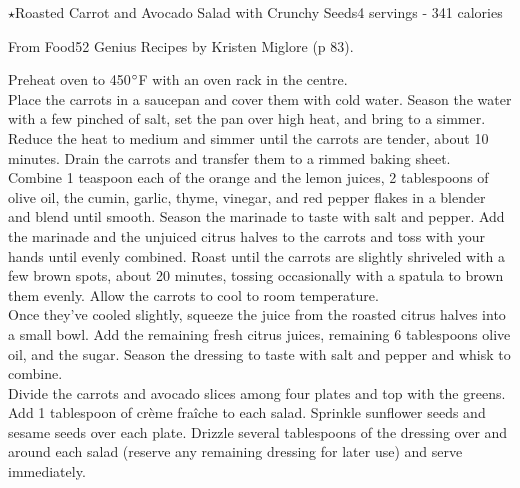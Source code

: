 \begin{recipe}{$\star$Roasted Carrot and Avocado Salad with Crunchy Seeds}{4 servings - 341 calories}{}

\freeform From {\normalfont Food52 Genius Recipes} by Kristen Miglore (p 83).


Preheat oven to 450$\degree$F with an oven rack in the centre.\\

Place the carrots in a saucepan and cover them with cold water. Season the water with a few pinched of salt, set the pan over high heat, and bring to a simmer. Reduce the heat to medium and simmer until the carrots are tender, about 10 minutes. Drain the carrots and transfer them to a rimmed baking sheet.\\

Combine 1 teaspoon each of the orange and the lemon juices, 2 tablespoons of olive oil, the cumin, garlic, thyme, vinegar, and red pepper flakes in a blender and blend until smooth. Season the marinade to taste with salt and pepper. Add the marinade and the unjuiced citrus halves to the carrots and toss with your hands until evenly combined. Roast until the carrots are slightly shriveled with a few brown spots, about 20 minutes, tossing occasionally with a spatula to brown them evenly. Allow the carrots to cool to room temperature.\\

Once they've cooled slightly, squeeze the juice from the roasted citrus halves into a small bowl. Add the remaining fresh citrus juices, remaining 6 tablespoons olive oil, and the sugar. Season the dressing to taste with salt and pepper and whisk to combine.\\

Divide the carrots and avocado slices among four plates and top with the greens. Add 1 tablespoon of crème fraîche to each salad. Sprinkle sunflower seeds and sesame seeds over each plate. Drizzle several tablespoons of the dressing over and around each salad (reserve any remaining dressing for later use) and serve immediately.

\end{recipe}